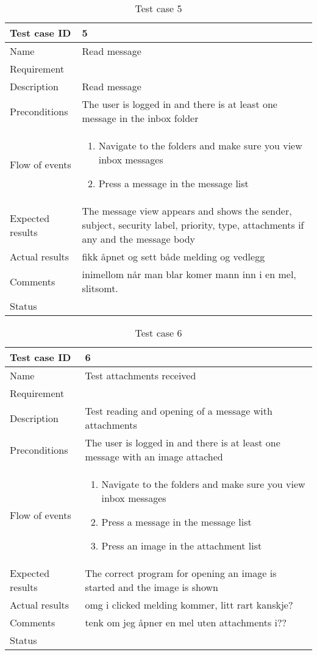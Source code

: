 \begin{table}
\begin{tabular}{l|p{10cm}}
Test case ID & 5 \\ \hline
Name & Read message\\ \hline
Requirement & \\ \hline
Description & Read message\\ \hline
Preconditions & The user is logged in and there is at least one message in the inbox folder\\ \hline
Flow of events & 
\begin{enumerate}
\item{}Navigate to the folders and make sure you view inbox messages
\item{}Press a message in the message list
\end{enumerate} \\ \hline
Expected results & The message view appears and shows the sender, subject, security label, priority, type, attachments if any and the message body\\ \hline \hline
Actual results & fikk åpnet og sett både melding og vedlegg \\ \hline
Comments & inimellom når man blar komer mann inn i en mel, slitsomt. \\ \hline
Status & 
\end{tabular}
\caption{Test case 5} \label{tab:case5}
\end{table}

\begin{table}
\begin{tabular}{l|p{10cm}}
Test case ID & 6 \\ \hline
Name & Test attachments received\\ \hline
Requirement & \\ \hline
Description & Test reading and opening of a message with attachments\\ \hline
Preconditions & The user is logged in and there is at least one message with an image attached\\ \hline
Flow of events & 
\begin{enumerate}
\item{}Navigate to the folders and make sure you view inbox messages
\item{}Press a message in the message list
\item{}Press an image in the attachment list
\end{enumerate} \\ \hline
Expected results & The correct program for opening an image is started and the image is shown\\ \hline \hline
Actual results & omg i clicked melding kommer, litt rart kanskje?\\ \hline
Comments & tenk om jeg åpner en mel uten attachments i??\\ \hline
Status & 
\end{tabular}
\caption{Test case 6} \label{tab:case6}
\end{table}

